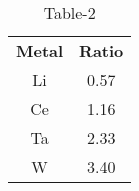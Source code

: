 \begin{table}[htbp]
  \centering
  \caption{Table-2}
  \label{table2}
  \begin{tabular}{cc}
\textbf{Metal} & \textbf{Ratio} \\
Li & 0.57 \\
Ce & 1.16 \\
Ta & 2.33 \\
W & 3.40 \\
  \end{tabular}
\end{table}